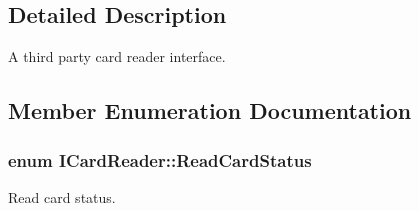 \subsection{Detailed Description}
A third party card reader interface. 

\subsection{Member Enumeration Documentation}
\subsubsection[{\texorpdfstring{Read\+Card\+Status}{ReadCardStatus}}]{\setlength{\rightskip}{0pt plus 5cm}enum {\bf I\+Card\+Reader\+::\+Read\+Card\+Status}}\hypertarget{classICardReader_a3b289f13ac2a90f46950289aafb551a9}{}\label{classICardReader_a3b289f13ac2a90f46950289aafb551a9}


Read card status. 

